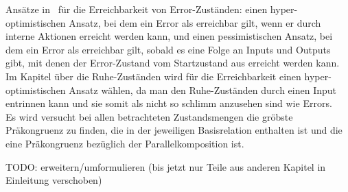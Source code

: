 Ansätze in~\cite{Vogler2014EIO} für die Erreichbarkeit von Error-Zuständen:
einen hyper-optimistischen Ansatz, bei dem ein Error als erreichbar gilt, wenn
er durch interne Aktionen erreicht werden kann, und einen pessimistischen
Ansatz, bei dem ein Error als erreichbar gilt, sobald es eine Folge an Inputs
und Outputs gibt, mit denen der Error-Zustand vom Startzustand aus erreicht
werden kann.\\
Im Kapitel über die Ruhe-Zuständen wird für die Erreichbarkeit einen
hyper-optimistischen Ansatz wählen, da man den Ruhe-Zuständen durch einen Input
entrinnen kann und sie somit als nicht so \glqq{}schlimm\grqq{} anzusehen sind
wie Errors.\\
Es wird versucht bei allen betrachteten Zustandsmengen die gröbste Präkongruenz zu
finden, die in der jeweiligen Basisrelation enthalten ist und die eine
Präkongruenz bezüglich der Parallelkomposition ist.

\scriptsize\textcolor{lgray}{TODO: erweitern/umformulieren (bis jetzt nur Teile
aus anderen Kapitel in Einleitung verschoben)}

\normalsize
